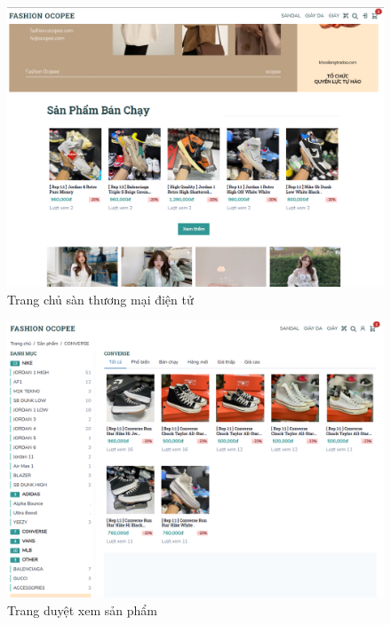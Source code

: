 \begin{figure}[!htbp]
	\begin{center}	
		\includegraphics[width=\textwidth]{./results/homepage}
		\caption{Trang chủ sàn thương mại điện tử}
	\end{center}
\end{figure}
\clearpage
\FloatBarrier
\begin{figure}[!htbp]
	\begin{center}	
		\includegraphics[width=\textwidth]{./results/categories-page}
		\caption{Trang duyệt xem sản phẩm}
	\end{center}
\end{figure}
\clearpage
\FloatBarrier
